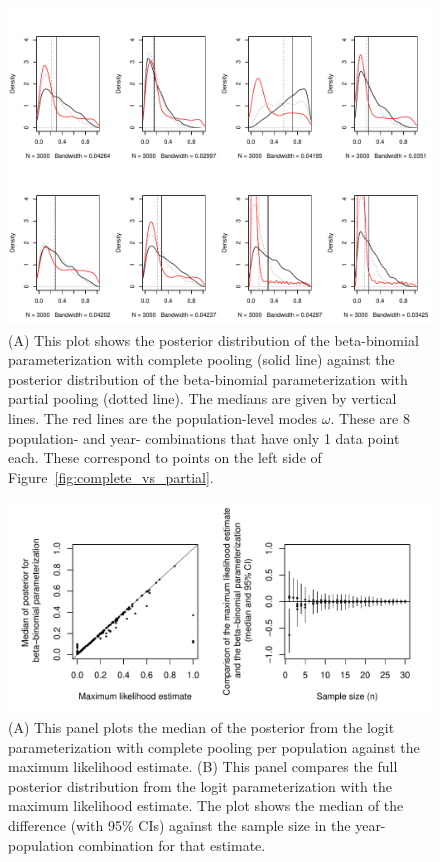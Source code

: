 \documentclass[12pt, oneside, titlepage]{article}   	%
\begin{document}
 \begin{figure}[h]
   \centering
       \includegraphics[page=1,width=.9\textwidth]{../figures/appendix-x-mismatch}  
    \caption{ (A) This plot shows the posterior distribution of the beta-binomial parameterization with complete pooling (solid line) against the posterior distribution of the beta-binomial parameterization with partial pooling (dotted line). The medians are given by vertical lines. The red lines are the population-level modes $\omega$. These are 8 population- and year- combinations that have only 1 data point each. These correspond to points on the left side of Figure~\ref{fig:complete_vs_partial}. }
 \label{fig:mismatch}
\end{figure}

\iffalse
 \begin{figure}[h]
   \centering
       \includegraphics[page=1,width=.9\textwidth]{../figures/appendix-x-mle_bayeslogit}  
    \caption{ (A) This panel plots the median of the posterior from the logit parameterization with complete pooling per population against the maximum likelihood estimate. (B) This panel compares the full posterior distribution from the logit parameterization with the maximum likelihood estimate. The plot shows the median of the difference (with 95\% CIs) against the sample size in the year-population combination for that estimate. }
 \label{fig:logit}
\end{figure}
\end{document}
